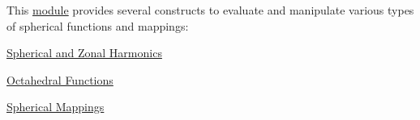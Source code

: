 \begin{DoxyParagraph}{}
This \hyperlink{group__spherical__functions}{module} provides several constructs to evaluate and manipulate various types of spherical functions and mappings\+:
\end{DoxyParagraph}

\begin{DoxyItemize}
\item \hyperlink{group__spherical__harmonics}{Spherical and Zonal Harmonics}
\item \hyperlink{group__octahedral__functions}{Octahedral Functions}
\item \hyperlink{group__spherical__mappings}{Spherical Mappings} 
\end{DoxyItemize}